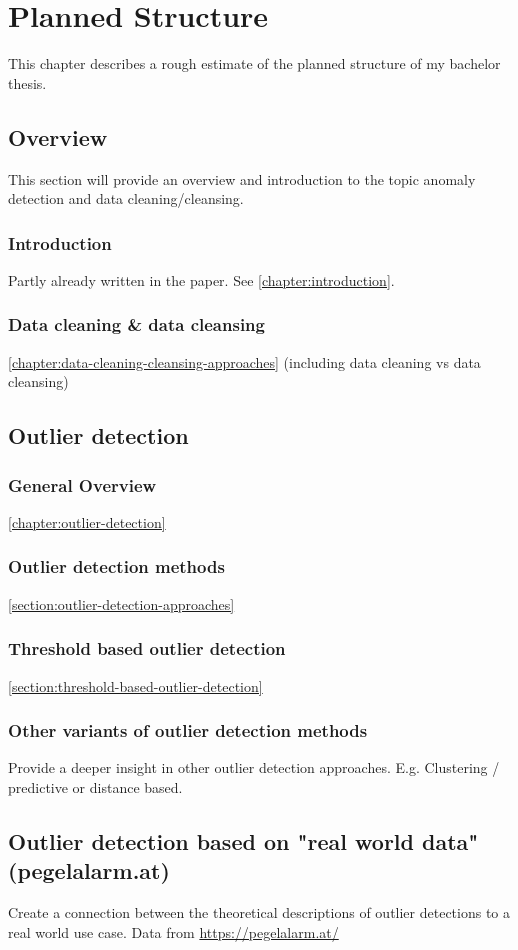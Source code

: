 \chapter{Planned Structure}
This chapter describes a rough estimate of the planned structure of my bachelor thesis.
\section{Overview}
This section will provide an overview and introduction to the topic anomaly detection and data cleaning/cleansing.
\subsection{Introduction}
Partly already written in the paper. See \autoref{chapter:introduction}.
\subsection{Data cleaning \& data cleansing}
\autoref{chapter:data-cleaning-cleansing-approaches}
(including data cleaning vs data cleansing)
\section{Outlier detection}
\subsection{General Overview}
\autoref{chapter:outlier-detection}

\subsection{Outlier detection methods}
\autoref{section:outlier-detection-approaches}
\subsection{Threshold based outlier detection}
\autoref{section:threshold-based-outlier-detection}
\subsection{Other variants of outlier detection methods}
Provide a deeper insight in other outlier detection approaches. E.g. Clustering / predictive or distance based.
\section{Outlier detection based on "real world data" (pegelalarm.at)}
Create a connection between the theoretical descriptions of outlier detections to a real world use case. Data from \url{https://pegelalarm.at/}
